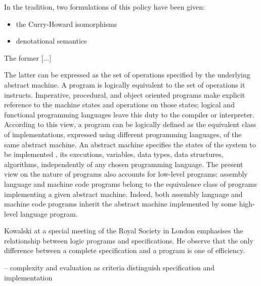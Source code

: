 \documentclass[]{article}
\begin{document}
In the tradition, two formulations of this policy have been given:

\begin{itemize}
\item the Curry-Howard isomorphisms
\item denotational semantics
\end{itemize}




{\color{red}{this passage is inspired by Jean-Baptiste's note}}


The former [...]

The latter can be expressed as the set of operations specified by the underlying abstract machine. A program is logically equivalent to the set of
operations it instructs. Imperative, procedural, and object oriented programs make explicit reference to the machine states and operations on those states; logical and functional programming languages leave this duty to the compiler or interpreter.  According to this view, a program can be logically defined as the equivalent class of implementations, expressed using different programming languages, of the same abstract machine. An abstract machine specifies the states of the system to be  implemented , its executions, variables, data types, data structures, algorithms, independently of any chosen programming language. The present view on the nature of programs also accounts for low-level programs: assembly language and machine code programs belong to the equivalence class of programs implementing a given abstract machine. Indeed, both assembly language and machine code programs inherit the abstract machine implemented by some high-level language program.


{\color{red}{(Selmer:) A good program P from the pov of a rational mind M is one that M has rigorous reason to believe will behave correctly upon execution. Without logic, “rigorous reason” cannot be meaningfully explicated. Therefore, all good program require logic. (Note that “logic” includes “inductive logic.”) }}

{\color{red}{Ray (links down to Magna Carta)}}


Kowalski at a special meeting of the Royal Society in London emphasises
the relationship between logic programs and specifications. He observe that
the only difference between a complete specification and a program is one of
efficiency.


-- complexity and evaluation as criteria distinguish specification and implementation
\end{document}
